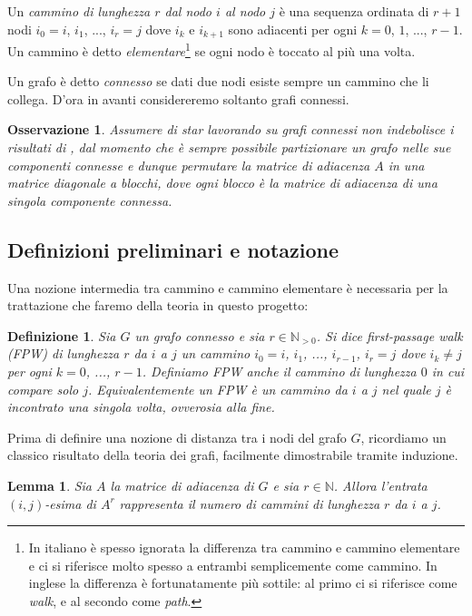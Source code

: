\documentclass[a4paper]{article}
\newcommand{\NN}{\mathbb{N}}
\newcommand{\NNp}{\mathbb{N}_{> 0}}
\newtheorem{lemma}{Lemma}
\newtheorem{definition}{Definizione}
\newtheorem{remark}{Osservazione}
\begin{document}
Un \textit{cammino di lunghezza $r$ dal nodo $i$ al nodo $j$} è una sequenza
ordinata di $r+1$ nodi $i_0 = i$, $i_1$, ..., $i_r = j$ dove $i_k$ e $i_{k+1}$ sono adiacenti per ogni $k = 0$, $1$, ..., $r-1$. Un cammino
è detto \textit{elementare}\footnote{In italiano è spesso ignorata la differenza tra cammino e cammino elementare e ci si riferisce molto spesso a entrambi semplicemente come cammino. In inglese la differenza è fortunatamente più sottile: al primo ci si riferisce come \textit{walk}, e al secondo come \textit{path}.} se ogni nodo è toccato al più una volta.

Un grafo è detto \textit{connesso} se dati due nodi esiste sempre un cammino che li collega. D'ora in avanti considereremo soltanto grafi connessi.

\begin{remark}
	Assumere di star lavorando su grafi connessi non indebolisce i risultati
	di \cite{katz2024}, dal momento che è sempre possibile partizionare
	un grafo nelle sue componenti connesse e dunque permutare la matrice
	di adiacenza $A$ in una matrice diagonale a blocchi, dove ogni blocco
	è la matrice di adiacenza di una singola componente connessa.
\end{remark}

\subsection{Definizioni preliminari e notazione}

Una nozione intermedia tra cammino e cammino elementare è necessaria per
la trattazione che faremo della teoria in questo progetto:

\begin{definition} \label{def:fpw} Sia $G$ un grafo connesso e sia
	$r \in \NNp$. Si dice {\rm first-passage walk (FPW) di lunghezza $r$ da $i$ a $j$} un cammino $i_0 = i$, $i_1$, ..., $i_{r-1}$, $i_r = j$ dove
	$i_k \neq j$ per ogni $k = 0$, ..., $r-1$. Definiamo FPW anche il cammino di lunghezza $0$ in cui compare solo $j$. Equivalentemente un FPW è un
	cammino da $i$ a $j$ nel quale $j$ è incontrato una singola volta,
	ovverosia alla fine.
\end{definition}

Prima di definire una nozione di distanza tra i nodi del grafo $G$, ricordiamo un classico risultato della teoria dei grafi, facilmente
dimostrabile tramite induzione.

\begin{lemma}
	\label{lemma:numero_cammini}
	Sia $A$ la matrice di adiacenza di $G$ e sia $r \in \NN$. Allora l'entrata $(i,j)$-esima di $A^r$ rappresenta il numero di cammini
	di lunghezza $r$ da $i$ a $j$.
\end{lemma}
\end{document}
